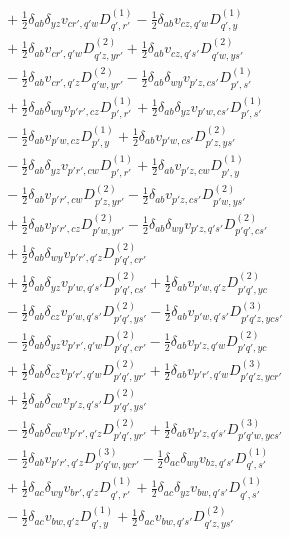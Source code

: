 \begin{align*}
&\quad +\tfrac12\delta_{ab}\delta_{yz}v_{cr',q'w}D^{(1)}_{q',r'}-\tfrac12\delta_{ab}v_{cz,q'w}D^{(1)}_{q',y} \\
&\quad +\tfrac12\delta_{ab}v_{cr',q'w}D^{(2)}_{q'z,yr'}+\tfrac12\delta_{ab}v_{cz,q's'}D^{(2)}_{q'w,ys'} \\
&\quad -\tfrac12\delta_{ab}v_{cr',q'z}D^{(2)}_{q'w,yr'}-\tfrac12\delta_{ab}\delta_{wy}v_{p'z,cs'}D^{(1)}_{p',s'} \\
&\quad +\tfrac12\delta_{ab}\delta_{wy}v_{p'r',cz}D^{(1)}_{p',r'}+\tfrac12\delta_{ab}\delta_{yz}v_{p'w,cs'}D^{(1)}_{p',s'} \\
&\quad -\tfrac12\delta_{ab}v_{p'w,cz}D^{(1)}_{p',y}+\tfrac12\delta_{ab}v_{p'w,cs'}D^{(2)}_{p'z,ys'} \\
&\quad -\tfrac12\delta_{ab}\delta_{yz}v_{p'r',cw}D^{(1)}_{p',r'}+\tfrac12\delta_{ab}v_{p'z,cw}D^{(1)}_{p',y} \\
&\quad -\tfrac12\delta_{ab}v_{p'r',cw}D^{(2)}_{p'z,yr'}-\tfrac12\delta_{ab}v_{p'z,cs'}D^{(2)}_{p'w,ys'} \\
&\quad +\tfrac12\delta_{ab}v_{p'r',cz}D^{(2)}_{p'w,yr'}-\tfrac12\delta_{ab}\delta_{wy}v_{p'z,q's'}D^{(2)}_{p'q',cs'} \\
&\quad +\tfrac12\delta_{ab}\delta_{wy}v_{p'r',q'z}D^{(2)}_{p'q',cr'} \\
&\quad +\tfrac12\delta_{ab}\delta_{yz}v_{p'w,q's'}D^{(2)}_{p'q',cs'}+\tfrac12\delta_{ab}v_{p'w,q'z}D^{(2)}_{p'q',yc} \\
&\quad -\tfrac12\delta_{ab}\delta_{cz}v_{p'w,q's'}D^{(2)}_{p'q',ys'}-\tfrac12\delta_{ab}v_{p'w,q's'}D^{(3)}_{p'q'z,ycs'} \\
&\quad -\tfrac12\delta_{ab}\delta_{yz}v_{p'r',q'w}D^{(2)}_{p'q',cr'}-\tfrac12\delta_{ab}v_{p'z,q'w}D^{(2)}_{p'q',yc} \\
&\quad +\tfrac12\delta_{ab}\delta_{cz}v_{p'r',q'w}D^{(2)}_{p'q',yr'}+\tfrac12\delta_{ab}v_{p'r',q'w}D^{(3)}_{p'q'z,ycr'} \\
&\quad +\tfrac12\delta_{ab}\delta_{cw}v_{p'z,q's'}D^{(2)}_{p'q',ys'} \\
&\quad -\tfrac12\delta_{ab}\delta_{cw}v_{p'r',q'z}D^{(2)}_{p'q',yr'}+\tfrac12\delta_{ab}v_{p'z,q's'}D^{(3)}_{p'q'w,ycs'} \\
&\quad -\tfrac12\delta_{ab}v_{p'r',q'z}D^{(3)}_{p'q'w,ycr'}-\tfrac12\delta_{ac}\delta_{wy}v_{bz,q's'}D^{(1)}_{q',s'} \\
&\quad +\tfrac12\delta_{ac}\delta_{wy}v_{br',q'z}D^{(1)}_{q',r'}+\tfrac12\delta_{ac}\delta_{yz}v_{bw,q's'}D^{(1)}_{q',s'} \\
&\quad -\tfrac12\delta_{ac}v_{bw,q'z}D^{(1)}_{q',y}+\tfrac12\delta_{ac}v_{bw,q's'}D^{(2)}_{q'z,ys'} \\

\end{align*}
